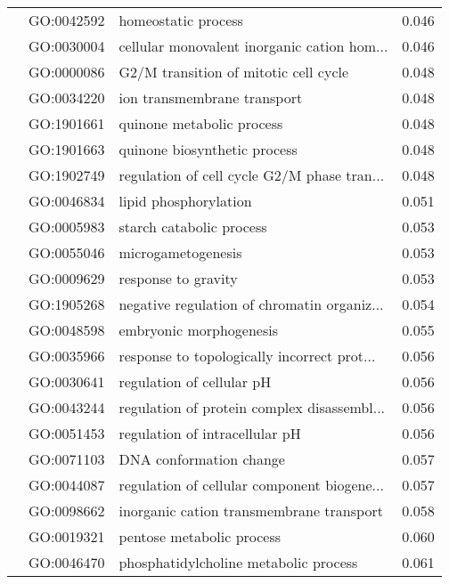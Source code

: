 \begin{longtable}{lllr}
   & GO:0042592 &                          homeostatic process &         0.046 \\
   & GO:0030004 &  cellular monovalent inorganic cation hom... &         0.046 \\
   & GO:0000086 &        G2/M transition of mitotic cell cycle &         0.048 \\
   & GO:0034220 &                  ion transmembrane transport &         0.048 \\
   & GO:1901661 &                    quinone metabolic process &         0.048 \\
   & GO:1901663 &                 quinone biosynthetic process &         0.048 \\
   & GO:1902749 &  regulation of cell cycle G2/M phase tran... &         0.048 \\
   & GO:0046834 &                        lipid phosphorylation &         0.051 \\
   & GO:0005983 &                     starch catabolic process &         0.053 \\
   & GO:0055046 &                           microgametogenesis &         0.053 \\
   & GO:0009629 &                          response to gravity &         0.053 \\
   & GO:1905268 &  negative regulation of chromatin organiz... &         0.054 \\
   & GO:0048598 &                      embryonic morphogenesis &         0.055 \\
   & GO:0035966 &  response to topologically incorrect prot... &         0.056 \\
   & GO:0030641 &                    regulation of cellular pH &         0.056 \\
   & GO:0043244 &  regulation of protein complex disassembl... &         0.056 \\
   & GO:0051453 &               regulation of intracellular pH &         0.056 \\
   & GO:0071103 &                      DNA conformation change &         0.057 \\
   & GO:0044087 &  regulation of cellular component biogene... &         0.057 \\
   & GO:0098662 &     inorganic cation transmembrane transport &         0.058 \\
   & GO:0019321 &                    pentose metabolic process &         0.060 \\
   & GO:0046470 &        phosphatidylcholine metabolic process &         0.061 \\

\end{longtable}
